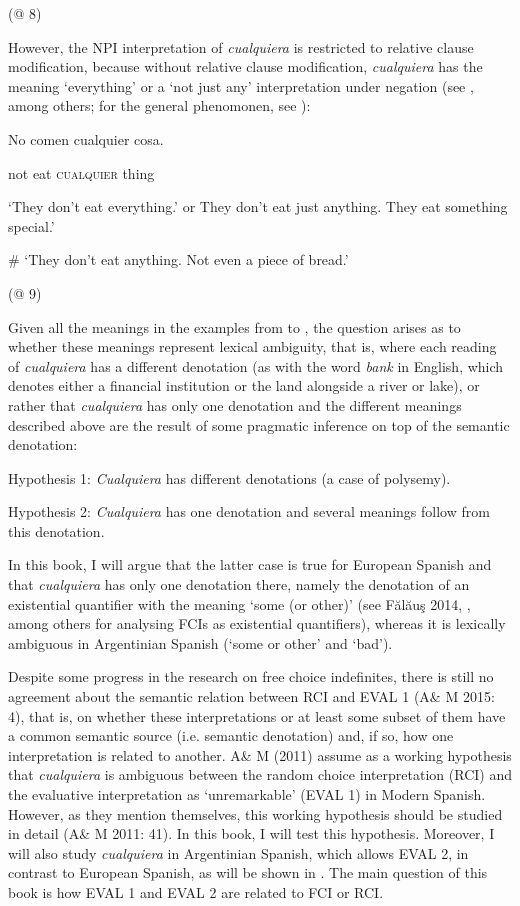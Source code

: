     (@ 8)

However, the NPI interpretation of \textit{cualquiera} is restricted to relative clause modification, because without relative clause modification, \textit{cualquiera} has the meaning ‘everything’ or a ‘not just any’ interpretation under negation (see \citealt{Arregui2006}, among others; for the general phenomonen, see \citealt{Chierchia2006}):

    No  comen  cualquier  cosa.

    not  eat  \textsc{cualquier}  thing

    ‘They don’t eat everything.’ or They don’t eat just anything. They eat something special.’

    \# ‘They don’t eat anything. Not even a piece of bread.’

    (@ 9)

Given all the meanings in the examples from  to , the question arises as to whether these meanings represent lexical ambiguity, that is, where each reading of \textit{cualquiera} has a different denotation (as with the word \textit{bank} in English, which denotes either a financial institution or the land alongside a river or lake), or rather that \textit{cualquiera} has only one denotation and the different meanings described above are the result of some pragmatic inference on top of the semantic denotation:

    Hypothesis 1: \textit{Cualquiera} has different denotations (a case of polysemy).

    Hypothesis 2: \textit{Cualquiera} has one denotation and several meanings follow from this denotation.

In this book, I will argue that the latter case is true for European Spanish and that \textit{cualquiera} has only one denotation there, namely the denotation of an existential quantifier with the meaning ‘some (or other)’ (see Fălăuş 2014, \citealt{Aloni2021}, among others for analysing FCIs as existential quantifiers), whereas it is lexically ambiguous in Argentinian Spanish (‘some or other’ and ‘bad’).

  Despite some progress in the research on free choice indefinites, there is still no agreement about the semantic relation between RCI and EVAL 1 (A\& M 2015: 4), that is, on whether these interpretations or at least some subset of them have a common semantic source (i.e. semantic denotation) and, if so, how one interpretation is related to another. A\& M (2011) assume as a working hypothesis that \textit{cualquiera} is ambiguous between the random choice interpretation (RCI) and the evaluative interpretation as ‘unremarkable’ (EVAL 1) in Modern Spanish. However, as they mention themselves, this working hypothesis should be studied in detail (A\& M 2011: 41). In this book, I will test this hypothesis. Moreover, I will also study \textit{cualquiera} in Argentinian Spanish, which allows EVAL 2, in contrast to European Spanish, as will be shown in . The main question of this book is how EVAL 1 and EVAL 2 are related to FCI or RCI. 

